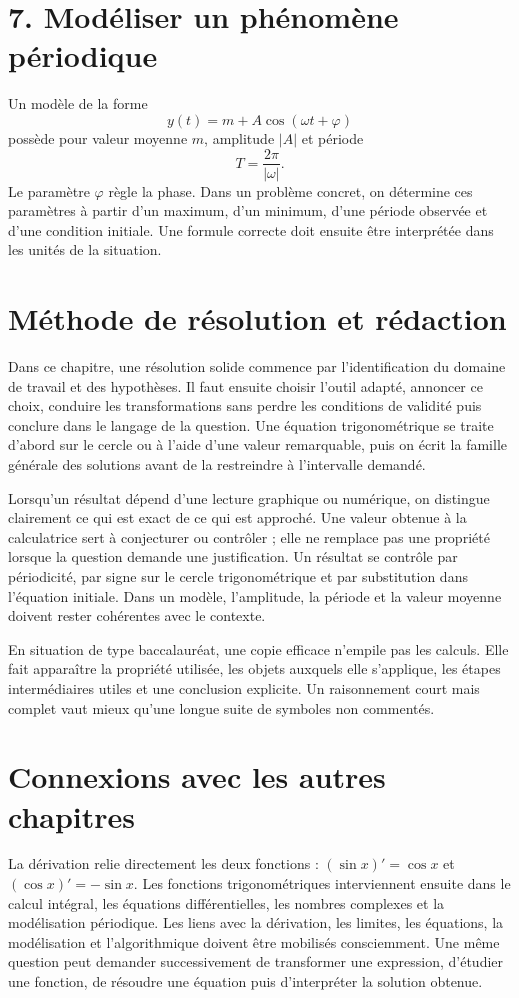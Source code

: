 \section{7. Modéliser un phénomène périodique}
Un modèle de la forme
\[
y(t)=m+A\cos(\omega t+\varphi)
\]
possède pour valeur moyenne $m$, amplitude $|A|$ et période
\[
T=\frac{2\pi}{|\omega|}.
\]
Le paramètre $\varphi$ règle la phase. Dans un problème concret, on détermine ces paramètres à partir d’un maximum, d’un minimum, d’une période observée et d’une condition initiale. Une formule correcte doit ensuite être interprétée dans les unités de la situation.

\section{Méthode de résolution et rédaction}
Dans ce chapitre, une résolution solide commence par l’identification du domaine de travail et des hypothèses. Il faut ensuite choisir l’outil adapté, annoncer ce choix, conduire les transformations sans perdre les conditions de validité puis conclure dans le langage de la question. Une équation trigonométrique se traite d’abord sur le cercle ou à l’aide d’une valeur remarquable, puis on écrit la famille générale des solutions avant de la restreindre à l’intervalle demandé.

Lorsqu’un résultat dépend d’une lecture graphique ou numérique, on distingue clairement ce qui est exact de ce qui est approché. Une valeur obtenue à la calculatrice sert à conjecturer ou contrôler ; elle ne remplace pas une propriété lorsque la question demande une justification. Un résultat se contrôle par périodicité, par signe sur le cercle trigonométrique et par substitution dans l’équation initiale. Dans un modèle, l’amplitude, la période et la valeur moyenne doivent rester cohérentes avec le contexte.

En situation de type baccalauréat, une copie efficace n’empile pas les calculs. Elle fait apparaître la propriété utilisée, les objets auxquels elle s’applique, les étapes intermédiaires utiles et une conclusion explicite. Un raisonnement court mais complet vaut mieux qu’une longue suite de symboles non commentés.

\section{Connexions avec les autres chapitres}
La dérivation relie directement les deux fonctions : $(\sin x)'=\cos x$ et $(\cos x)'=-\sin x$. Les fonctions trigonométriques interviennent ensuite dans le calcul intégral, les équations différentielles, les nombres complexes et la modélisation périodique.
Les liens avec la dérivation, les limites, les équations, la modélisation et l’algorithmique doivent être mobilisés consciemment. Une même question peut demander successivement de transformer une expression, d’étudier une fonction, de résoudre une équation puis d’interpréter la solution obtenue.

